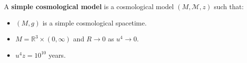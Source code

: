 A \textbf{simple cosmological model} is a cosmological model $(M, \mathcal{M}, z)$ such that:
\begin{itemize}
\item[(a)] $(M, g)$ is a simple cosmological spacetime.
\item[(b)] $M = \mathbb{R}^3 \times (0, \infty)$ and $R \to 0$ as $u^4 \to 0$.
\item[(c)] $u^4 z = 10^{10}$ years.
\end{itemize}
